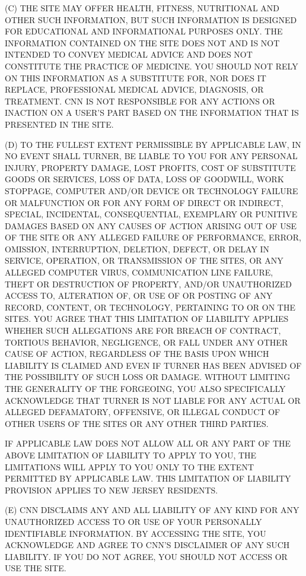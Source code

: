 (C) THE SITE MAY OFFER HEALTH, FITNESS, NUTRITIONAL AND OTHER SUCH
INFORMATION, BUT SUCH INFORMATION IS DESIGNED FOR EDUCATIONAL AND
INFORMATIONAL PURPOSES ONLY. THE INFORMATION CONTAINED ON THE SITE DOES
NOT AND IS NOT INTENDED TO CONVEY MEDICAL ADVICE AND DOES NOT CONSTITUTE
THE PRACTICE OF MEDICINE. YOU SHOULD NOT RELY ON THIS INFORMATION AS A
SUBSTITUTE FOR, NOR DOES IT REPLACE, PROFESSIONAL MEDICAL ADVICE,
DIAGNOSIS, OR TREATMENT. CNN IS NOT RESPONSIBLE FOR ANY ACTIONS OR
INACTION ON A USER'S PART BASED ON THE INFORMATION THAT IS PRESENTED IN
THE SITE.

(D) TO THE FULLEST EXTENT PERMISSIBLE BY APPLICABLE LAW, IN NO EVENT
SHALL TURNER, BE LIABLE TO YOU FOR ANY PERSONAL INJURY, PROPERTY DAMAGE,
LOST PROFITS, COST OF SUBSTITUTE GOODS OR SERVICES, LOSS OF DATA, LOSS
OF GOODWILL, WORK STOPPAGE, COMPUTER AND/OR DEVICE OR TECHNOLOGY FAILURE
OR MALFUNCTION OR FOR ANY FORM OF DIRECT OR INDIRECT, SPECIAL,
INCIDENTAL, CONSEQUENTIAL, EXEMPLARY OR PUNITIVE DAMAGES BASED ON ANY
CAUSES OF ACTION ARISING OUT OF USE OF THE SITE OR ANY ALLEGED FAILURE
OF PERFORMANCE, ERROR, OMISSION, INTERRUPTION, DELETION, DEFECT, OR
DELAY IN SERVICE, OPERATION, OR TRANSMISSION OF THE SITES, OR ANY
ALLEGED COMPUTER VIRUS, COMMUNICATION LINE FAILURE, THEFT OR DESTRUCTION
OF PROPERTY, AND/OR UNAUTHORIZED ACCESS TO, ALTERATION OF, OR USE OF OR
POSTING OF ANY RECORD, CONTENT, OR TECHNOLOGY, PERTAINING TO OR ON THE
SITES. YOU AGREE THAT THIS LIMITATION OF LIABILITY APPLIES WHEHER SUCH
ALLEGATIONS ARE FOR BREACH OF CONTRACT, TORTIOUS BEHAVIOR, NEGLIGENCE,
OR FALL UNDER ANY OTHER CAUSE OF ACTION, REGARDLESS OF THE BASIS UPON
WHICH LIABILITY IS CLAIMED AND EVEN IF TURNER HAS BEEN ADVISED OF THE
POSSIBILITY OF SUCH LOSS OR DAMAGE. WITHOUT LIMITING THE GENERALITY OF
THE FORGEOING, YOU ALSO SPECIFICALLY ACKNOWLEDGE THAT TURNER IS NOT
LIABLE FOR ANY ACTUAL OR ALLEGED DEFAMATORY, OFFENSIVE, OR ILLEGAL
CONDUCT OF OTHER USERS OF THE SITES OR ANY OTHER THIRD PARTIES.

IF APPLICABLE LAW DOES NOT ALLOW ALL OR ANY PART OF THE ABOVE LIMITATION
OF LIABILITY TO APPLY TO YOU, THE LIMITATIONS WILL APPLY TO YOU ONLY TO
THE EXTENT PERMITTED BY APPLICABLE LAW. THIS LIMITATION OF LIABILITY
PROVISION APPLIES TO NEW JERSEY RESIDENTS.

(E) CNN DISCLAIMS ANY AND ALL LIABILITY OF ANY KIND FOR ANY UNAUTHORIZED
ACCESS TO OR USE OF YOUR PERSONALLY IDENTIFIABLE INFORMATION. BY
ACCESSING THE SITE, YOU ACKNOWLEDGE AND AGREE TO CNN'S DISCLAIMER OF ANY
SUCH LIABILITY. IF YOU DO NOT AGREE, YOU SHOULD NOT ACCESS OR USE THE
SITE.

